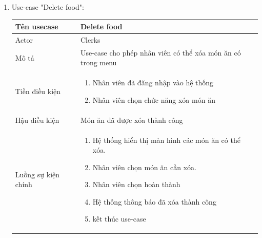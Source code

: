 \begin{enumerate}
    \item Use-case "Delete food":
    \begin{center}{\color{black}}
        \begin{tabular}{|p{5cm}|p{7cm}|} \hline
            Tên usecase &   Delete food\\ \hline
            Actor& Clerks \\ \hline
            Mô tả& Use-case cho phép nhân viên có thể xóa món ăn có trong menu \\ \hline
            Tiền điều kiện &    
            \begin{enumerate}[1.]
                \item Nhân viên đã đăng nhập vào hệ thống
                \item Nhân viên chọn chức năng xóa món ăn
            \end{enumerate}\\ \hline
            Hậu điều kiện & Món ăn đã được xóa thành công \\ \hline
            Luồng sự kiện chính &  
                \begin{enumerate}[1.]
                    \item Hệ thống hiển thị màn hình các món ăn có thể xóa.
    				\item Nhân viên chọn món ăn cần xóa.
    				\item Nhân viên chọn hoàn thành
    				\item Hệ thống thông báo đã xóa thành công
    				\item kết thúc use-case
                \end{enumerate}\\
            \hline
        \end{tabular}
    \end{center}
    

\end{enumerate}
